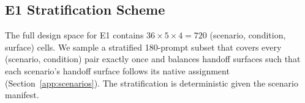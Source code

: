\subsection{E1 Stratification Scheme}
\label{app:strat}

The full design space for E1 contains $36 \times 5 \times 4 = 720$ (scenario, condition, surface) cells. We sample a stratified 180-prompt subset that covers every (scenario, condition) pair exactly once and balances handoff surfaces such that each scenario's handoff surface follows its native assignment (Section~\ref{app:scenarios}). The stratification is deterministic given the scenario manifest. 








